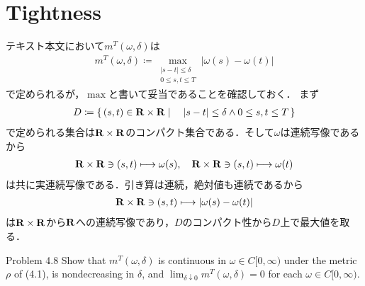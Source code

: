 \section{Tightness}
	テキスト本文において$m^T(\omega,\delta)$は
	\begin{align}
		m^T(\omega,\delta) \coloneqq \operatorname*{max}_{\substack{|s-t| \leq \delta \\ 0 \leq s,t \leq T}}|\omega(s) - \omega(t)|
	\end{align}
	で定められるが，$\operatorname{max}$と書いて妥当であることを確認しておく．
	まず
	\begin{align}
		D \coloneqq \left\{\, (s,t) \in \mathbf{R} \times \mathbf{R} \mid \quad |s-t| \leq \delta \wedge 0 \leq s,t \leq T\, \right\}
	\end{align}
	で定められる集合は$\mathbf{R} \times \mathbf{R}$のコンパクト集合である．そして$\omega$は連続写像であるから
	\begin{align}
		\mathbf{R} \times \mathbf{R} \ni (s,t) \longmapsto \omega(s), 
		\quad \mathbf{R} \times \mathbf{R} \ni (s,t) \longmapsto \omega(t)
	\end{align}
	は共に実連続写像である．引き算は連続，絶対値も連続であるから
	\begin{align}
		\mathbf{R} \times \mathbf{R} \ni (s,t) \longmapsto |\omega(s) - \omega(t)|
	\end{align}
	は$\mathbf{R} \times \mathbf{R}$から$\mathbf{R}$への連続写像であり，$D$のコンパクト性から$D$上で最大値を取る．
	
	\begin{itembox}[l]{Problem 4.8}
		Show that $m^T(\omega,\delta)$ is continuous in $\omega \in C[0,\infty)$ under the metric
		$\rho$ of (4.1), is nondecreasing in $\delta$, and 
		$\lim_{\delta \downarrow 0}m^T(\omega,\delta) = 0$ for each $\omega \in C[0,\infty)$.
	\end{itembox}
	
